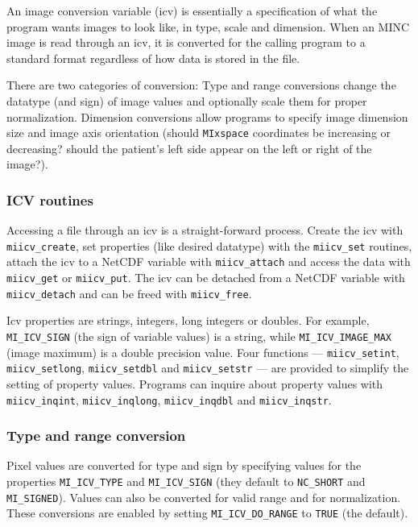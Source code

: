 An image conversion variable (icv) is essentially a specification of what
the program wants images to look like, in type, scale and dimension.
When an MINC image is read through an icv, it is converted for the
calling program to a standard format regardless of how data is stored
in the file.

There are two categories of conversion: Type and range conversions
change the datatype (and sign) of image values and optionally scale
them for proper normalization. Dimension conversions allow programs to
specify image dimension size and image axis orientation (should
\verb+MIxspace+ coordinates be increasing or decreasing? should the
patient's left side appear on the left or right of the image?).

\subsubsection{ICV routines}

Accessing a file through an icv is a straight-forward process.
Create the icv with \verb+miicv_create+, set properties
(like desired datatype) with the \verb+miicv_set+ routines, attach the
icv to a NetCDF 
variable with \verb+miicv_attach+ and access the data with
\verb+miicv_get+ or \verb+miicv_put+. The icv can be detached from a
NetCDF variable with \verb+miicv_detach+ and can be freed with
\verb+miicv_free+.

Icv properties are strings, integers, long integers or doubles. For
example, \verb+MI_ICV_SIGN+ (the sign of variable values) is a string,
while \verb+MI_ICV_IMAGE_MAX+ (image maximum) is a double precision
value.  Four functions --- \verb+miicv_setint+, \verb+miicv_setlong+,
\verb+miicv_setdbl+ and \verb+miicv_setstr+ ---
are provided to simplify the setting of property values. Programs can
inquire about property values with \verb+miicv_inqint+,
\verb+miicv_inqlong+, \verb+miicv_inqdbl+ and \verb+miicv_inqstr+.

\subsubsection{Type and range conversion}

Pixel values are converted for type and sign by specifying values for
the properties \verb+MI_ICV_TYPE+ and \verb+MI_ICV_SIGN+ (they default
to \verb+NC_SHORT+ and \verb+MI_SIGNED+). Values can also be converted
for valid range and for normalization. These conversions are enabled
by setting \verb+MI_ICV_DO_RANGE+ to \verb+TRUE+ (the default).

